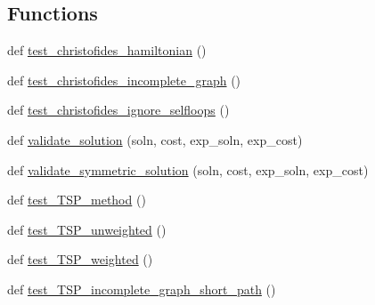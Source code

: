 \subsection*{Functions}
\begin{DoxyCompactItemize}
\item 
def \hyperlink{namespacenetworkx_1_1algorithms_1_1approximation_1_1tests_1_1test__traveling__salesman_a821b86d506f8c499fc8f085b6bcfa951}{test\+\_\+christofides\+\_\+hamiltonian} ()
\item 
def \hyperlink{namespacenetworkx_1_1algorithms_1_1approximation_1_1tests_1_1test__traveling__salesman_af09c81b0e9fab220a2bf65a149dbbfa7}{test\+\_\+christofides\+\_\+incomplete\+\_\+graph} ()
\item 
def \hyperlink{namespacenetworkx_1_1algorithms_1_1approximation_1_1tests_1_1test__traveling__salesman_a3551d6e758acb4ff1428076f1b3722ab}{test\+\_\+christofides\+\_\+ignore\+\_\+selfloops} ()
\item 
def \hyperlink{namespacenetworkx_1_1algorithms_1_1approximation_1_1tests_1_1test__traveling__salesman_a71c7cc6845b07e4214c25326973dee02}{validate\+\_\+solution} (soln, cost, exp\+\_\+soln, exp\+\_\+cost)
\item 
def \hyperlink{namespacenetworkx_1_1algorithms_1_1approximation_1_1tests_1_1test__traveling__salesman_a03b64b5e7049ade335fff2b72a961045}{validate\+\_\+symmetric\+\_\+solution} (soln, cost, exp\+\_\+soln, exp\+\_\+cost)
\item 
def \hyperlink{namespacenetworkx_1_1algorithms_1_1approximation_1_1tests_1_1test__traveling__salesman_a9e3bd35f334556a9551ec8bbaacdf38a}{test\+\_\+\+T\+S\+P\+\_\+method} ()
\item 
def \hyperlink{namespacenetworkx_1_1algorithms_1_1approximation_1_1tests_1_1test__traveling__salesman_a57f65382228d24d1975caf8e8e3b7d2c}{test\+\_\+\+T\+S\+P\+\_\+unweighted} ()
\item 
def \hyperlink{namespacenetworkx_1_1algorithms_1_1approximation_1_1tests_1_1test__traveling__salesman_a61958a0ee712da4f9ef44ae9c0ef8286}{test\+\_\+\+T\+S\+P\+\_\+weighted} ()
\item 
def \hyperlink{namespacenetworkx_1_1algorithms_1_1approximation_1_1tests_1_1test__traveling__salesman_a255fc37ed2809f98bab331e8575c637e}{test\+\_\+\+T\+S\+P\+\_\+incomplete\+\_\+graph\+\_\+short\+\_\+path} ()
\end{DoxyCompactItemize}
